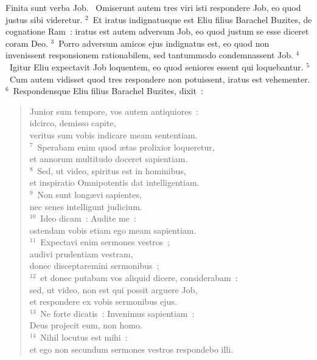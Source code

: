  Finita sunt verba Job.
~\lettrine[lines=10,image=true,loversize=0.05,lraise=-0.03]{O}{}miserunt autem tres viri isti respondere Job, eo quod justus sibi videretur.
${}^{2}$~Et iratus indignatusque est Eliu filius Barachel Buzites, de cognatione Ram~: iratus est autem adversum Job, eo quod justum se esse diceret coram Deo.
${}^{3}$~Porro adversum amicos ejus indignatus est, eo quod non invenissent responsionem rationabilem, sed tantummodo condemnassent Job.
${}^{4}$~Igitur Eliu expectavit Job loquentem, eo quod seniores essent qui loquebantur.
${}^{5}$~Cum autem vidisset quod tres respondere non potuissent, iratus est vehementer.
${}^{6}$~Respondensque Eliu filius Barachel Buzites, dixit~: \begin{flushleft}\begin{verse}Junior sum tempore, vos autem antiquiores~:\\ idcirco, demisso capite,\\ veritus sum vobis indicare meam sententiam.\\
${}^{7}$~Sperabam enim quod \ae tas prolixior loqueretur,\\ et annorum multitudo doceret sapientiam.\\
${}^{8}$~Sed, ut video, spiritus est in hominibus,\\ et inspiratio Omnipotentis dat intelligentiam.\\
${}^{9}$~Non sunt long\ae vi sapientes,\\ nec senes intelligunt judicium.\\
${}^{10}$~Ideo dicam~: Audite me~:\\ ostendam vobis etiam ego meam sapientiam.\\
${}^{11}$~Expectavi enim sermones vestros~;\\ audivi prudentiam vestram,\\ donec disceptaremini sermonibus~;\\
${}^{12}$~et donec putabam vos aliquid dicere, considerabam~:\\ sed, ut video, non est qui possit arguere Job,\\ et respondere ex vobis sermonibus ejus.\\
${}^{13}$~Ne forte dicatis~: Invenimus sapientiam~:\\ Deus projecit eum, non homo.\\
${}^{14}$~Nihil locutus est mihi~:\\ et ego non secundum sermones vestros respondebo illi.\\

\end{verse}
\end{flushleft}
